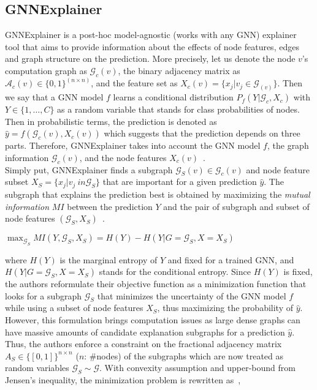 \subsection{GNNExplainer}
\label{subsec:ExplainingGNNs_GNNExplainer}
GNNExplainer is a post-hoc model-agnostic (works with any GNN) explainer tool that aims to provide information about the effects of node features, edges and graph structure on the prediction. More precisely, let us denote the node $v$'s computation graph as $\mathcal{G}_c(v)$, the binary adjacency matrix as $\mathcal{A}_c(v) \in \{0, 1\}^(n \times n)$, and the feature set as $X_c(v) = \{x_j|v_j \in \mathcal{G}_(v)\}$. Then we say that a GNN model $f$ learns a conditional distribution $P_f(Y | \mathcal{G}_c, X_c)$ with $Y \in \{1, \dots, C\}$ as a random variable that stands for class probabilities of nodes. Then in probabilistic terms, the prediction is denoted as $\hat{y} = f(\mathcal{G}_c(v), X_c(v))$ which suggests that the prediction depends on three parts. Therefore, GNNExplainer takes into account the GNN model $f$, the graph information $\mathcal{G}_c(v)$, and the node features $X_c(v)$~\parencite{GNNExplainer_Ying}.\\
Simply put, GNNExplainer finds a subgraph $\mathcal{G}_S(v) \in \mathcal{G}_c(v)$ and node feature subset $X_S = \{x_j | v_j \ in \mathcal{G}_S\}$ that are important for a given prediction $\hat{y}$. The subgraph that explains the prediction best is obtained by maximizing the \emph{mutual information} $MI$ between the prediction $Y$ and the pair of subgraph and subset of node features $(\mathcal{G}_S, X_S)$~\parencite{GNNExplainer_Ying}.
\begin{center}
    $\max_{\mathcal{G}_S} MI(Y, \mathcal{G}_S, X_S) = H(Y) - H(Y|G=\mathcal{G}_S, X=X_S)$
\end{center}
where $H(Y)$ is the marginal entropy of $Y$ and fixed for a trained GNN, and $H(Y|G=\mathcal{G}_S, X=X_S)$ stands for the conditional entropy. Since $H(Y)$ is fixed, the authors reformulate their objective function as a minimization function that looks for a subgraph $\mathcal{G}_S$ that minimizes the uncertainty of the GNN model $f$ while using a subset of node features $X_S$, thus maximizing the probability of $\hat{y}$. However, this formulation brings computation issues as large dense graphs can have massive amounts of candidate explanation subgraphs for a prediction $\hat{y}$. Thus, the authors enforce a constraint on the fractional adjacency matrix $A_S \in \{[0, 1]\}^{n \times n}$ ($n$: \#nodes) of the subgraphs which are now treated as random variables $\mathcal{G}_S \sim \mathcal{G}$. With convexity assumption and upper-bound from Jensen's inequality, the minimization problem is rewritten as~\parencite{GNNExplainer_Ying},
